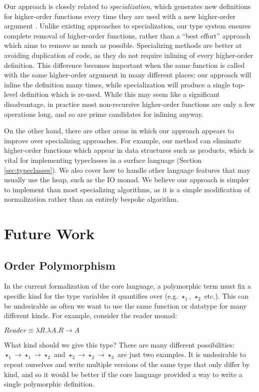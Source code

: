 \documentclass[runningheads]{llncs}
\begin{document}
Our approach is closely related to \emph{specialization}, which generates new definitions for higher-order functions every time they are used with a new higher-order argument \cite{chin1996higher}. Unlike existing approaches to specialization, our type system ensures complete removal of higher-order functions, rather than a ``best effort'' approach which aims to remove as much as possible. Specializing methods are better at avoiding duplication of code, as they do not require inlining of every higher-order definition. This difference becomes important when the same function is called with the same higher-order argument in many different places: our approach will inline the definition many times, while specialization will produce a single top-level definition which is re-used. While this may seem like a significant disadvantage, in practice most non-recursive higher-order functions are only a few operations long, and so are prime candidates for inlining anyway.

On the other hand, there are other areas in which our approach appears to improve over specializing approaches. For example, our method can eliminate higher-order functions which appear in data structures such as products, which is vital for implementing typeclasses in a surface language (Section \ref{sec:typeclasses}). We also cover how to handle other language features that may usually use the heap, such as the IO monad. We believe our approach is simpler to implement than most specializing algorithms, as it is a simple modification of normalization rather than an entirely bespoke algorithm.
\section{Future Work}

\subsection{Order Polymorphism} \label{sec:order-polymorphism}

In the current formalization of the core language, a polymorphic term must fix a specific kind for the type variables it quantifies over (e.g. $\star_1$, $\star_2$ etc.). This can be undesirable as often we want to use the same function or datatype for many different kinds. For example, consider the reader monad:

$Reader \equiv \lambda R. \lambda A. R \rightarrow A$

What kind should we give this type? There are many different possibilities: $\star_1 \rightarrow \star_1 \rightarrow \star_2$ and $\star_2 \rightarrow \star_2 \rightarrow \star_3$ are just two examples. It is undesirable to repeat ourselves and write multiple versions of the same type that only differ by kind, and so it would be better if the core language provided a way to write a single polymorphic definition.
\end{document}
